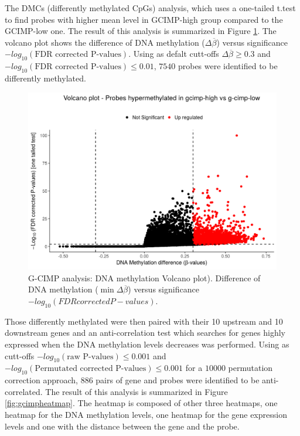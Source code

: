 The DMCs (differently methylated CpGs) analysis, which uses a one-tailed t.test to find
probes with higher mean level in GCIMP-high group compared to the GCIMP-low one.
The result of this analysis is summarized in Figure \ref{fig:gcimpvolcano}.
The volcano plot shows the difference of DNA methylation ($\Delta\overline{\beta}$)
versus significance $-log_{10}(\textrm{FDR corrected P-values})$. Using as defalt cutt-offs
 $\Delta\overline{\beta}\geq0.3$ and $-log_{10}(\textrm{FDR corrected P-values})\leq 0.01$,
$7540$ probes were identified to be differently methylated.

\begin{center}
\begin{figure}[h!]
\includegraphics[width=16cm]{images/gcimp_volcano.png}
\caption[G-CIMP analysis: Volcano plot]{\label{fig:gcimpvolcano}G-CIMP analysis: DNA methylation  Volcano plot). Difference of DNA methylation ($\min\Delta\overline{\beta}$) versus significance $-log_{10}(FDR corrected P-values)$.}
\end{figure}

\end{center}

Those differently methylated were then paired with their 10 upstream and 10 downstream genes
and an anti-correlation test which searches for genes highly expressed when the DNA methylation levels
decreases was performed.
Using as cutt-offs
$-log_{10}(\textrm{raw P-values})\leq 0.001$ and $-log_{10}(\textrm{Permutated corrected P-values})\leq 0.001$
for a  $10000$ permutation correction approach,
886 pairs of gene and probes were identified to be anti-correlated.
The result of this analysis is summarized in Figure \ref{fig:gcimpheatmap}.
The heatmap is composed of other three heatmaps, one heatmap for the DNA methylation levels,
one heatmap for the gene expression levels and one with the distance between
the gene and the probe.

